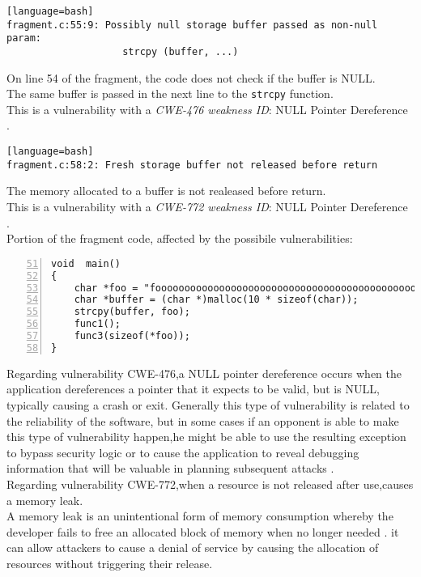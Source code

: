 \documentclass[a4paper,12pt]{article}
\begin{document}
\begin{lstlisting}[style=DOS][language=bash]
fragment.c:55:9: Possibly null storage buffer passed as non-null param:
                    strcpy (buffer, ...)
\end{lstlisting}
On line 54 of the fragment, the code does not check if the buffer is NULL.\\
The same buffer is passed in the next line to the \texttt{strcpy} function.\\
This is a vulnerability with a \textit{CWE-476 weakness ID}: NULL Pointer Dereference \cite{CWE476}.\\
\begin{lstlisting}[style=DOS][language=bash]
fragment.c:58:2: Fresh storage buffer not released before return
\end{lstlisting}
The memory allocated to a buffer is not  realeased before return.\\
This is a vulnerability with a \textit{CWE-772 weakness ID}: NULL Pointer Dereference \cite{CWE476}.\\
\newpage
Portion of the fragment code, affected by the possibile vulnerabilities:
\begin{lstlisting}[style=c,numbers=left,firstnumber=51,linebackgroundcolor={
\ifnum\value{lstnumber}=54\color{red}\fi
\ifnum\value{lstnumber}=55\color{red}\fi
\ifnum\value{lstnumber}=58\color{red}\fi
}]
void  main()
{
	char *foo = "fooooooooooooooooooooooooooooooooooooooooooooooooooo";
	char *buffer = (char *)malloc(10 * sizeof(char));
	strcpy(buffer, foo);
	func1();
	func3(sizeof(*foo));
}
\end{lstlisting}
Regarding vulnerability CWE-476,a NULL pointer dereference occurs when the application dereferences a pointer that it expects to be valid, but is NULL, typically causing a crash or exit.
Generally this type of vulnerability is related to the reliability of the software, but in some cases if an opponent is able to make this type of vulnerability happen,he might be able to use the resulting exception to bypass security logic or to cause the application to reveal debugging information that will be valuable in planning subsequent attacks \cite{nulldef}.\\
Regarding vulnerability CWE-772,when a resource is not released after use,causes a memory leak.\\
A memory leak is an unintentional form of memory consumption whereby the developer fails to free an allocated block of memory when no longer needed \cite{memoryleak}. it can allow attackers to cause a denial of service by causing the allocation of resources without triggering their release\cite{CWE772}.
\end{document}
